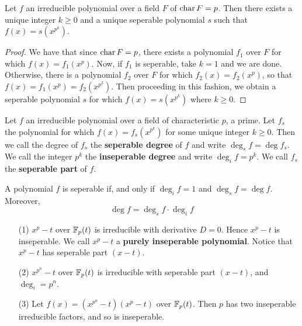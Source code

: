 \begin{lemma}\label{lemma_8.6.8}
  Let $f$ an irreducible polynomial over a field $F$ of  $\operatorname{char}{F}=p$. Then
  there exists a unique integer $k \geq 0$ and a unique seperable polynomial
  $s$ such that  $f(x)=s(x^{p^k})$.
\end{lemma}
\begin{proof}
  We have that since $\operatorname{char}{F}=p$, there exists a polynomial $f_1$ over $F$
  for which $f(x)=f_1(x^p)$.  Now, if $f_1$ is seperable, take $k=1$ and we
  are done. Otherwise, there is a polynomial $f_2$ over $F$ for which
  $f_2(x)=f_2(x^p)$, so that $f(x)=f_1(x^p)=f_2(x^{p^2})$. Then proceeding in
  this fashion, we obtain a seperable polynomial $s$ for which
  $f(x)=s(x^{p^k})$ where $k \geq 0$.
\end{proof}

\begin{definition}
  Let $f$ an irreducible polynomial over a field of characteristic $p$, a
  prime. Let  $f_s$ the polynomial for which $f(x)=f_s(x^{p^k})$ for some
  unique integer $k \geq 0$. Then we call the degree of $f_s$ the
  \textbf{seperable degree} of $f$ and write  $\deg_s{f}=\deg{f_s}$. We call
  the integer $p^k$ the  \textbf{inseperable degree} and write
  $\deg_i{f}=p^k$. We call $f_s$ the  \textbf{seperable part} of $f$.
\end{definition}

\begin{lemma}\label{lemma_8.6.9}
  A polynomial $f$ is seperable if, and only if  $\deg_i{f}=1$ and
  $\deg_s{f}=\deg{f}$. Moreover,
  \begin{equation*}
    \deg{f}=\deg_s{f} \cdot \deg_i{f}
  \end{equation*}
\end{lemma}

\begin{example}\label{example_8.17}
  \begin{enumerate}
    \item[(1)] $x^p-t$ over  $\mathbb{F}_p(t)$ is irreducible with derivative $D=0$.
      Hence  $x^p-t$ is inseperable. We call  $x^p-t$ a  \textbf{purely
      inseperable polynomial}. Notice that $x^p-t$ has seperable part
      $(x-t)$.

    \item[(2)] $x^{p^n}-t$ over $\mathbb{F}_p(t)$ is irreducible with seperable part
      $(x-t)$, and $\deg_i=p^n$.

    \item [(3)] Let $f(x)=(x^{p^n}-t)(x^p-t)$ over $\mathbb{F}_p(t)$. Then $p$ has
      two inseperable irreducible factors, and so is inseperable.
  \end{enumerate}
\end{example}


